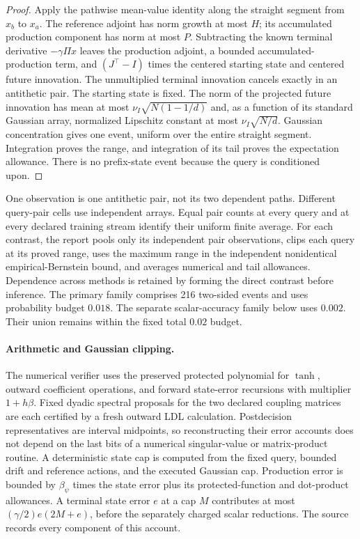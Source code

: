 \begin{proof}
Apply the pathwise mean-value identity along the straight segment from
$x_b$ to $x_a$. The reference adjoint has norm growth at most $H$;
its accumulated production component has norm at most $P$. Subtracting
the known terminal derivative $-\gamma\Pi x$ leaves the production
adjoint, a bounded accumulated-production term, and
$(J^\top-I)$ times the centered starting state and centered future
innovation. The unmultiplied terminal innovation cancels exactly in an
antithetic pair. The starting state is fixed. The norm of the projected
future innovation has mean at most $\nu_I\sqrt{N(1-1/d)}$ and,
as a function of its standard Gaussian array, normalized Lipschitz
constant at most $\nu_I\sqrt{N/d}$. Gaussian concentration gives
one event, uniform over the entire straight segment. Integration proves
the range, and integration of its tail proves the expectation allowance.
There is no prefix-state event because the query is conditioned upon.
\end{proof}

One observation is one antithetic pair, not its two dependent paths.
Different query-pair cells use independent arrays. Equal pair counts
at every query and at every declared training stream identify their
uniform finite average. For each contrast, the report pools only its
independent pair observations, clips each query at its proved range,
uses the maximum range in the independent nonidentical empirical-Bernstein
bound, and averages numerical and tail allowances. Dependence across
methods is retained by forming the direct contrast before inference.
The primary family comprises 216 two-sided events and uses probability
budget $0.018$. The separate scalar-accuracy family below uses $0.002$.
Their union remains within the fixed total $0.02$ budget.

\paragraph*{Arithmetic and Gaussian clipping.}
The numerical verifier uses the preserved protected polynomial for
$\tanh$, outward coefficient operations, and forward state-error
recursions with multiplier $1+h\beta$. Fixed dyadic spectral proposals
for the two declared coupling matrices are each certified by a fresh
outward LDL calculation. Postdecision representatives are interval
midpoints, so reconstructing their error accounts does not depend on
the last bits of a numerical singular-value or matrix-product routine.
A deterministic state cap
is computed from the fixed query, bounded drift and reference actions,
and the executed Gaussian cap. Production error is bounded by
$\beta_\psi$ times the state error plus its protected-function and
dot-product allowances. A terminal state error $e$ at a cap $M$
contributes at most $(\gamma/2)e(2M+e)$, before the separately charged
scalar reductions. The source records every component of this account.

